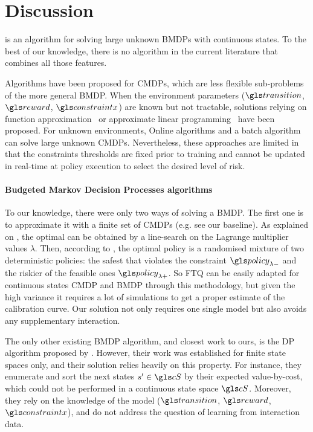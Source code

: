 \section*{Discussion}

 is an algorithm for solving large unknown \glspl{BMDP} with continuous states. To the best of our knowledge, there is no algorithm in the current literature that combines all those features.

Algorithms have been proposed for \glspl{CMDP}, which are less flexible sub-problems of the more general \gls{BMDP}. When the environment parameters ($\Ps$, $\R$, $\constraint$) are known but not tractable, solutions relying on function approximation~\citep{Undurti2011} or approximate linear programming~\citep{Poupart2015} have been proposed. For unknown environments, Online algorithms \citep{Geibel2005, Abe2010,Achiam2017,Chow2018} and a batch algorithm \citep{Thomas2015, Ghavamzadeh2016, Laroche2019,Le2019} can solve large unknown \glspl{CMDP}. Nevertheless, these approaches are limited in that the constraints thresholds are fixed prior to training and cannot be updated in real-time at policy execution to select the desired level of risk.

\paragraph{Budgeted Markov Decision Processes algorithms}
To our knowledge, there were only two ways of solving a \gls{BMDP}. The first one is to approximate it with a finite set of \glspl{CMDP} (e.g. see our \FTQl baseline). As explained on , the optimal  can be obtained by a line-search on the Lagrange multiplier values $\lambda$. Then, according to \citet[Theorem 4.4]{Beutler1985}, the optimal policy is a randomised mixture of two deterministic policies: the safest  that violates the constraint $\policy_{\lambda-}$ and the riskier of the feasible ones $\policy_{\lambda+}$. So \gls{FTQ} can be easily adapted for continuous states \gls{CMDP} and \gls{BMDP} through this methodology, but given the high variance it requires a lot of simulations to get a proper estimate of the calibration curve. Our solution not only requires one single model but also avoids any supplementary interaction.

The only other existing \gls{BMDP} algorithm, and closest work to ours, is the \gls{DP} algorithm proposed by \citet{Boutilier_Lu:uai16}. However, their work was established for finite state spaces only, and their solution relies heavily on this property. For instance, they enumerate and sort the next states $s'\in\cS$ by their expected value-by-cost, which could not be performed in a continuous state space $\cS$. Moreover, they rely on the knowledge of the model ($\Ps$, $\R$, $\constraint$), and do not address the question of learning from interaction data.


